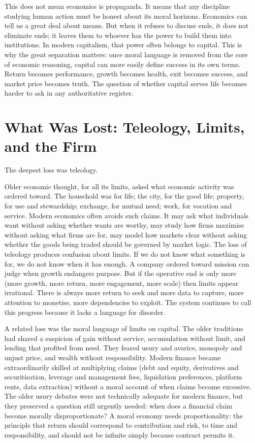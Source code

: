 \documentclass[11pt,a4paper,oneside]{book}
\begin{document}
This does not mean economics is propaganda. It means that any discipline studying human action must be honest about its moral horizons. Economics can tell us a great deal about means. But when it refuses to discuss ends, it does not eliminate ends; it leaves them to whoever has the power to build them into institutions. In modern capitalism, that power often belongs to capital. This is why the great separation matters: once moral language is removed from the core of economic reasoning, capital can more easily define success in its own terms. Return becomes performance, growth becomes health, exit becomes success, and market price becomes truth. The question of whether capital serves life becomes harder to ask in any authoritative register.

\section*{What Was Lost: Teleology, Limits, and the Firm}

The deepest loss was teleology.

Older economic thought, for all its limits, asked what economic activity was ordered toward. The household was for life; the city, for the good life; property, for use and stewardship; exchange, for mutual need; work, for vocation and service. Modern economics often avoids such claims. It may ask what individuals want without asking whether wants are worthy, may study how firms maximise without asking what firms are for, may model how markets clear without asking whether the goods being traded should be governed by market logic. The loss of teleology produces confusion about limits. If we do not know what something is for, we do not know when it has enough. A company ordered toward mission can judge when growth endangers purpose. But if the operative end is only more (more growth, more return, more engagement, more scale) then limits appear irrational. There is always more return to seek and more data to capture, more attention to monetise, more dependencies to exploit. The system continues to call this progress because it lacks a language for disorder.

A related loss was the moral language of limits on capital. The older traditions had shared a suspicion of gain without service, accumulation without limit, and lending that profited from need. They feared usury and avarice, monopoly and unjust price, and wealth without responsibility. Modern finance became extraordinarily skilled at multiplying claims (debt and equity, derivatives and securitisation, leverage and management fees, liquidation preferences, platform rents, data extraction) without a moral account of when claims become excessive. The older usury debates were not technically adequate for modern finance, but they preserved a question still urgently needed: when does a financial claim become morally disproportionate? A moral economy needs proportionality: the principle that return should correspond to contribution and risk, to time and responsibility, and should not be infinite simply because contract permits it.
\end{document}
